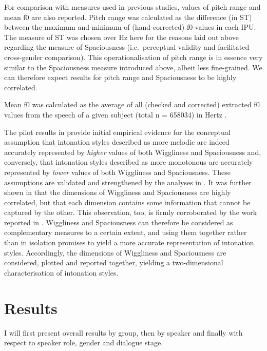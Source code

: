 For comparison with measures used in previous studies, values of pitch range and mean f0 are also reported. Pitch range was calculated as the difference (in ST) between the maximum and minimum of (hand-corrected) f0 values in each IPU. The measure of ST was chosen over Hz here for the reasons laid out above regarding the measure of Spaciousness (i.e.~perceptual validity and facilitated cross-gender comparison). This operationalisation of pitch range is in essence very similar to the Spaciousness measure introduced above, albeit less fine-grained. We can therefore expect results for pitch range and Spaciousness to be highly correlated.

Mean f0 was calculated as the average of all (checked and corrected) extracted f0 values from the speech of a given subject (total n = 658034) in Hertz \citep[semitone measurements are not suitable for level measures; cf.][]{mennenCrosslanguageDifferencesFundamental2012a}.

The pilot results in \citet{wehrleSomewhereSpectrumRobotic2018} provide initial empirical evidence for the conceptual assumption that intonation styles described as more melodic are indeed accurately represented by \emph{higher} values of both Wiggliness and Spaciousness and, conversely, that intonation styles described as more monotonous are accurately represented by \emph{lower} values of both Wiggliness and Spaciousness. These assumptions are validated and strengthened by the analyses in \citet{wehrleEvaluatingProsodicAspects2023}. It was further shown in \cite{wehrleSomewhereSpectrumRobotic2018} that the dimensions of Wiggliness and Spaciousness are highly correlated, but that each dimension contains some information that cannot be captured by the other. This observation, too, is firmly corroborated by the work reported in \citet{wehrleEvaluatingProsodicAspects2023}. Wiggliness and Spaciousness can therefore be considered as complementary measures to a certain extent, and using them together rather than in isolation promises to yield a more accurate representation of intonation styles. Accordingly, the dimensions of Wiggliness and Spaciousness are considered, plotted and reported together, yielding a two-dimensional characterisation of intonation styles.


\section{Results}\label{sec:intonation_results}

I will first present overall results by group, then by speaker and finally with respect to speaker role, gender and dialogue stage.

